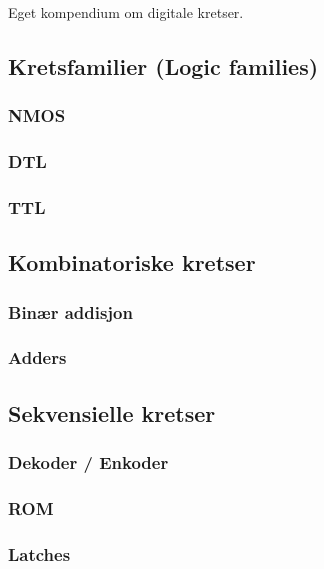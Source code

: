 Eget kompendium om digitale kretser.

\subsection{Kretsfamilier (Logic families)}
  

  \subsubsection{NMOS}
    

  \subsubsection{DTL}
    

  \subsubsection{TTL}
    

\subsection{Kombinatoriske kretser}
  

  \subsubsection{Binær addisjon}
    

  \subsubsection{Adders}
    

\subsection{Sekvensielle kretser}
    

  \subsubsection{Dekoder / Enkoder}
    

  \subsubsection{ROM}
    

  \subsubsection{Latches}
    
